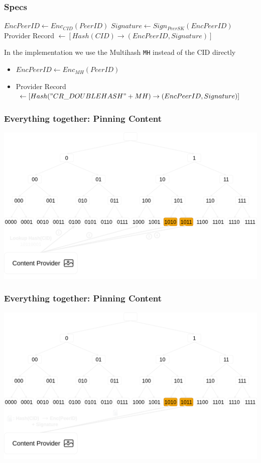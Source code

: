 \documentclass{pl-slide}
\begin{document}
\begin{frame}
\frametitle{Specs}

\begin{itemize}
	\itemc $EncPeerID \leftarrow Enc_{CID}(PeerID)$
	\itemc $Signature\leftarrow Sign_{PeerSK}(EncPeerID)$
	\itemc Provider Record $\leftarrow [Hash(CID) \rightarrow (EncPeerID, Signature)]$
\end{itemize}

\bigskip
In the implementation we use the Multihash \texttt{MH} instead of the CID directly
\begin{itemize}
	\item[\greencube] $EncPeerID \leftarrow Enc_{MH}(PeerID)$
	\item[\greencube] Provider Record $\leftarrow [Hash("CR\_DOUBLEHASH" + MH) \rightarrow (EncPeerID, Signature)]$
\end{itemize}

\end{frame}


\begin{frame}
\frametitle{Everything together: Pinning Content}
\begin{minipage}[b]{\linewidth}
\begin{center}
	\includegraphics[width=.8\linewidth,keepaspectratio]{resources/dht/dht-provider-lookup.png}
\end{center}
\end{minipage}
\end{frame}

\begin{frame}
\frametitle{Everything together: Pinning Content}
\begin{minipage}[b]{\linewidth}
\begin{center}
	\includegraphics[width=.8\linewidth,keepaspectratio]{resources/dht/dht-private-provider-records-publish.png}
\end{center}
\end{minipage}
\end{frame}
\end{document}
